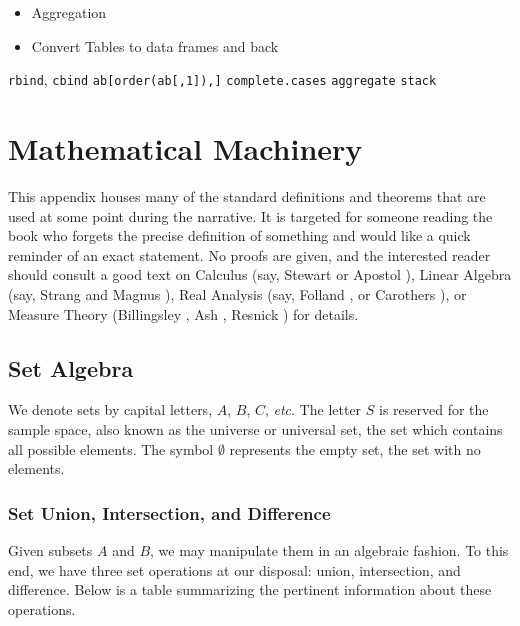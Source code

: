 \documentclass[captions=tableheading]{scrbook}
\begin{document}
\begin{itemize}
\item Aggregation
\item Convert Tables to data frames and back
\end{itemize}

\texttt{rbind}, \texttt{cbind}
\texttt{ab[order(ab[,1]),]}
\texttt{complete.cases}
\texttt{aggregate}
\texttt{stack}
\chapter{Mathematical Machinery}
\label{sec-21}

\label{cha:Mathematical-Machinery}

This appendix houses many of the standard definitions and theorems that are used at some point during the narrative. It is targeted for someone reading the book who forgets the precise definition of something and would like a quick reminder of an exact statement. No proofs are given, and the interested reader should consult a good text on Calculus (say, Stewart \cite{Stewart2008} or Apostol \cite{Apostol1967,ApostolI1967}), Linear Algebra (say, Strang \cite{Strang1988} and Magnus \cite{Magnus1999}), Real Analysis (say, Folland \cite{Folland1999}, or Carothers \cite{Carothers2000}), or Measure Theory (Billingsley \cite{Billingsley1995}, Ash \cite{Ash2000}, Resnick \cite{Resnick1999}) for details. 
\section{Set Algebra \label{sec:The-Algebra-of}}
\label{sec-21-1}


We denote sets by capital letters, \(A\), \(B\), \(C\), \emph{etc}. The letter \(S\) is reserved for the sample space, also known as the universe or universal set, the set which contains all possible elements. The symbol \(\emptyset\) represents the empty set, the set with no elements. 
\subsection{Set Union, Intersection, and Difference}
\label{sec-21-1-1}


Given subsets \(A\) and \(B\), we may manipulate them in an algebraic fashion. To this end, we have three set operations at our disposal: union, intersection, and difference. Below is a table summarizing the pertinent information about these operations.
\end{document}
